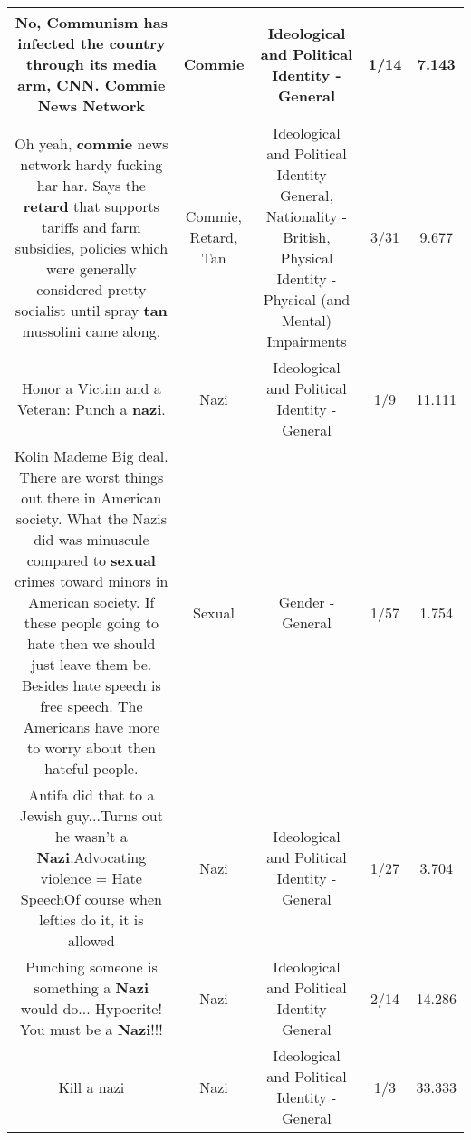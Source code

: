 \documentclass[11pt]{article}
\newlength\mylength
\begin{document}
\begin{center}
\begin{longtable}{|C{.65\mylength}|C{.30\mylength}|C{.12\mylength}|C{.12\mylength}|C{.12\mylength}|}
  \small No, Communism has infected the country through its media arm, CNN. \textbf{Commie} News Network\normalsize   & Commie &  Ideological and Political Identity - General & 1/14 & 7.143 \\  \hline
  \small Oh yeah, \textbf{commie} news network hardy fucking har har. Says the \textbf{retard} that supports tariffs and farm subsidies, policies which were generally considered pretty socialist until spray \textbf{tan} mussolini came along.\normalsize   & Commie, Retard, Tan &  Ideological and Political Identity - General, Nationality - British, Physical Identity - Physical (and Mental) Impairments & 3/31 & 9.677 \\  \hline
  \small Honor a Victim and a Veteran: Punch a \textbf{nazi}.\normalsize   & Nazi &  Ideological and Political Identity - General & 1/9 & 11.111 \\  \hline
  \small Kolin Mademe Big deal. There are worst things out there in American society. What the Nazis did was minuscule compared to \textbf{sexual} crimes toward minors in American society. If these people going to hate then we should just leave them be. Besides hate speech is free speech. The Americans have more to worry about then hateful people.\normalsize   & Sexual & Gender - General & 1/57 & 1.754 \\  \hline
  \small Antifa did that to a Jewish guy...Turns out he wasn't a \textbf{Nazi}.Advocating violence = Hate SpeechOf course when lefties do it, it is allowed\normalsize   & Nazi &  Ideological and Political Identity - General & 1/27 & 3.704 \\  \hline
  \small Punching someone is something a \textbf{Nazi} would do... Hypocrite! You must be a \textbf{Nazi}!!!\normalsize   & Nazi &  Ideological and Political Identity - General & 2/14 & 14.286 \\  \hline
  \small Kill a nazi\normalsize   & Nazi &  Ideological and Political Identity - General & 1/3 & 33.333 \\  \hline

\end{longtable}
\end{center}
\end{document}
